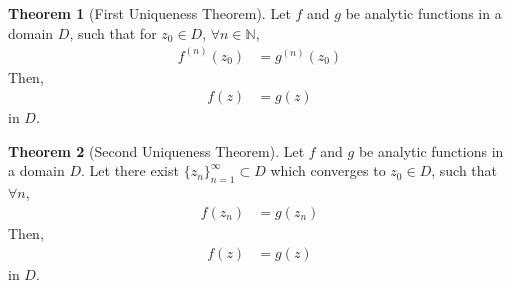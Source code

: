 \documentclass[titlepage, fleqn, a4paper, 12pt, twoside]{article}
\theoremstyle{definition}
\theoremstyle{theorem}
\newtheorem{theorem}{Theorem}
\begin{document}
\begin{theorem}[First Uniqueness Theorem]
	Let $f$ and $g$ be analytic functions in a domain $D$, such that for $z_0 \in D$, $\forall n \in \mathbb{N}$,
	\begin{align*}
		f^{(n)}(z_0) & = g^{(n)}(z_0)
	\end{align*}
	Then,
	\begin{align*}
		f(z) & = g(z)
	\end{align*}
	in $D$.
	\label{thm:First_Uniqueness_Theorem}
\end{theorem}

\begin{theorem}[Second Uniqueness Theorem]
	Let $f$ and $g$ be analytic functions in a domain $D$.
	Let there exist $\{z_n\}_{n = 1}^{\infty} \subset D$ which converges to $z_0 \in D$, such that $\forall n$,
	\begin{align*}
		f(z_n) & = g(z_n)
	\end{align*}
	Then,
	\begin{align*}
		f(z) & = g(z)
	\end{align*}
	in $D$.
	\label{thm:Second_Uniqueness_Theorem}
\end{theorem}
\end{document}

